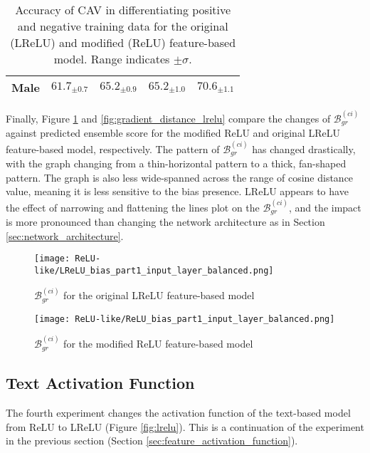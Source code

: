 \begin{table}[H]
\begin{tabular}{|c|cc|cc|}
        Male      & \multicolumn{1}{c|}{$61.7_{\pm 0.7}$}            & $65.2_{\pm 0.9}$
                  & \multicolumn{1}{c|}{$65.2_{\pm 1.0}$}            & $70.6_{\pm 1.1}$                   \\ \hline
    \end{tabular}
    \caption{Accuracy of CAV in differentiating positive and negative training data for the original (LReLU) and modified (ReLU) feature-based model. Range indicates $\pm \sigma$.}
    \label{tab:CAV_accuracy_relu}
\end{table}

Finally, Figure \ref{fig:gradient_distance_relu} and \ref{fig:gradient_distance_lrelu} compare the changes of $\mathcal{B}^{(ci)}_{gr}$ against predicted ensemble score for the modified ReLU and original LReLU feature-based model, respectively. The pattern of $\mathcal{B}^{(ci)}_{gr}$ has changed drastically, with the graph changing from a thin-horizontal pattern to a thick, fan-shaped pattern. The graph is also less wide-spanned across the range of cosine distance value, meaning it is less sensitive to the bias presence. LReLU appears to have the effect of narrowing and flattening the lines plot on the $\mathcal{B}^{(ci)}_{gr}$, and the impact is more pronounced than changing the network architecture as in Section \ref{sec:network_architecture}.

\begin{figure}[H]
    \centering
    \begin{minipage}[t]{0.48\textwidth}
        \centering
        \texttt{[image: ReLU-like/LReLU\_bias\_part1\_input\_layer\_balanced.png]}
        \caption{$\mathcal{B}^{(ci)}_{gr}$ for the original LReLU feature-based model}
        \label{fig:gradient_distance_lrelu}
    \end{minipage}
    \hfill
    \begin{minipage}[t]{0.48\textwidth}
        \centering
        \texttt{[image: ReLU-like/ReLU\_bias\_part1\_input\_layer\_balanced.png]}
        \caption{$\mathcal{B}^{(ci)}_{gr}$ for the modified ReLU feature-based model}
        \label{fig:gradient_distance_relu}
    \end{minipage}
\end{figure}


\subsection{Text Activation Function}
The fourth experiment changes the activation function of the text-based model from ReLU to LReLU (Figure \ref{fig:lrelu}). This is a continuation of the experiment in the previous section (Section \ref{sec:feature_activation_function}).

